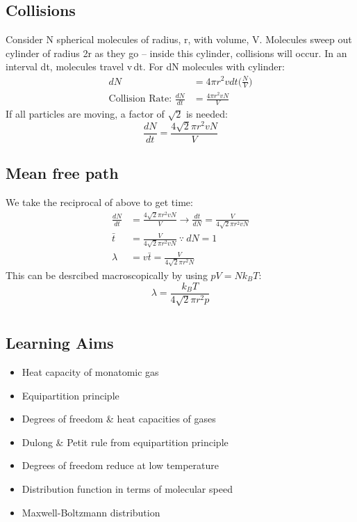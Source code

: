 \documentclass[a4paper, 11pt, normalem]{report}
\begin{document}
\section{Collisions}
Consider N spherical molecules of radius, r, with volume, V. 
Molecules sweep out cylinder of radius 2r as they go -- inside this cylinder, collisions will occur.
In an interval dt, molecules travel v{\,}dt.
For dN molecules with cylinder:
\begin{align}
    dN &= 4{\pi}r^{2}vdt\Big(\frac{N}{V}\Big) \\
    \text{Collision Rate: } \frac{dN}{dt} &= \frac{4{\pi}r^{2}vN}{V}
\end{align}
If all particles are moving, a factor of $\sqrt{2}$ is needed:
\begin{equation}
	\frac{dN}{dt} = \frac{4\sqrt{2}{\pi}r^{2}vN}{V}
\end{equation}

\section{Mean free path}
We take the reciprocal of above to get time:
\begin{align}
    \frac{dN}{dt} &= \frac{4\sqrt{2}{\pi}r^{2}vN}{V} \rightarrow \frac{dt}{dN} = \frac{V}{4\sqrt{2}{\pi}r^{2}vN} \\
    \bar{t} &= \frac{V}{4\sqrt{2}{\pi}r^{2}vN} ~\because~ dN = 1 \\
    \lambda &= v\bar{t} = \frac{V}{4\sqrt{2}{\pi}r^{2}N}
\end{align}
This can be desrcibed macroscopically by using $pV = Nk_{B}T$:
\begin{equation}
	\lambda = \frac{k_{B}T}{4\sqrt{2}{\pi}r^{2}p}
\end{equation}

\chapter{}
\section{Learning Aims}
\begin{itemize}
	\item Heat capacity of monatomic gas
	\item Equipartition principle
	\item Degrees of freedom \& heat capacities of gases
	\item Dulong \& Petit rule from equipartition principle
	\item Degrees of freedom reduce at low temperature
	\item Distribution function in terms of molecular speed
	\item Maxwell-Boltzmann distribution
\end{itemize}
\end{document}

